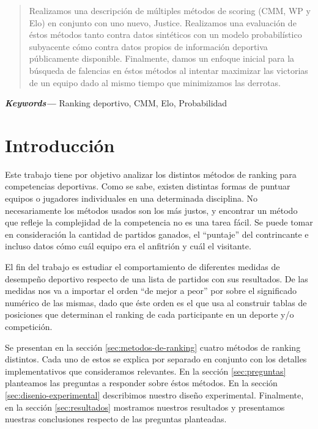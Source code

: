 \documentclass[a4paper]{article}
\begin{document}

\clearpage

\begin{abstract}
    Realizamos una descripción de múltiples métodos de scoring (CMM, WP y Elo) en conjunto con uno nuevo, Justice. Realizamos una evaluación de éstos métodos tanto contra datos sintéticos con un modelo probabilístico subyacente cómo contra datos propios de información deportiva públicamente disponible. Finalmente, damos un enfoque inicial para la búsqueda de falencias en éstos métodos al intentar maximizar las victorias de un equipo dado al mismo tiempo que minimizamos las derrotas.
\end{abstract}
{
  \small	
  \textbf{\textit{Keywords---}}
  {Ranking deportivo, CMM, Elo, Probabilidad}
}
\tableofcontents
\clearpage 

\section{Introducción} \label{sec:introduccion}

Este trabajo tiene por objetivo analizar los distintos métodos de ranking para competencias deportivas. Como se sabe, existen distintas formas de puntuar equipos o jugadores individuales en una determinada disciplina. No necesariamente los métodos usados son los más justos, y encontrar un método que refleje la complejidad de la competencia no es una tarea fácil. Se puede tomar en consideración la cantidad de partidos ganados, el ``puntaje'' del contrincante e incluso datos cómo cuál equipo era el anfitrión y cuál el visitante.

El fin del trabajo es estudiar el comportamiento de diferentes medidas de desempeño deportivo respecto de una lista de partidos con sus resultados. De las medidas nos va a importar el orden ``de mejor a peor'' por sobre el significado numérico de las mismas, dado que éste orden es el que usa al construir tablas de posiciones que determinan el ranking de cada participante en un deporte y/o competición.

Se presentan en la sección \ref{sec:metodos-de-ranking} cuatro métodos de ranking distintos. Cada uno de estos se explica por separado en conjunto con los detalles implementativos que consideramos relevantes. En la sección \ref{sec:preguntas} planteamos las preguntas a responder sobre éstos métodos. En la sección \ref{sec:disenio-experimental} describimos nuestro diseño experimental. Finalmente, en la sección \ref{sec:resultados} mostramos nuestros resultados y presentamos nuestras conclusiones respecto de las preguntas planteadas.
\end{document}
